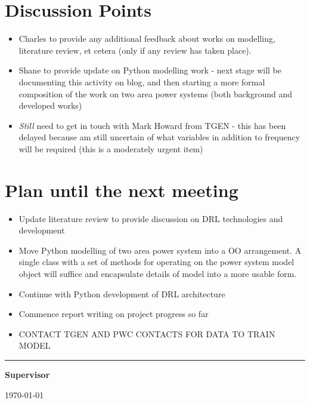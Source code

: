 \documentclass[12pt]{article}
\begin{document}
	\section{Discussion Points}
	\begin{itemize}
		\item Charles to provide any additional feedback about works on modelling, literature review, et cetera (only if any review has taken place).
		\item Shane to provide update on Python modelling work - next stage will be documenting this activity on blog, and then starting a more formal composition of the work on two area power systems (both background and developed works)
		\item \textit{Still} need to get in touch with Mark Howard from TGEN - this has been delayed because am still uncertain of what variables in addition to frequency will be required (this is a moderately urgent item)
	\end{itemize}

	\section{Plan until the next meeting}
	\begin{itemize}
		\item Update literature review to provide discussion on DRL technologies and development
		\item Move Python modelling of two area power system into a OO arrangement. A single class with a set of methods for operating on the power system model object will suffice and encapsulate details of model into a more usable form. 
		\item Continue with Python development of DRL architecture
		\item Commence report writing on project progress so far
		\item CONTACT TGEN AND PWC CONTACTS FOR DATA TO TRAIN MODEL
	\end{itemize}
	
	\par
	\vspace{\fill}%
	\noindent\rule{0.4\linewidth}{0.5pt}%
	\vspace{1em}%
	\par
	\noindent\textbf{Supervisor}\vspace{1em}%
	\par
	\noindent\today
\end{document}
